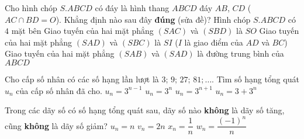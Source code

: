 \begin{ex}%
	Cho hình chóp $S.ABCD$ có đáy là hình thang $ABCD$ đáy $AB$, $CD$ ($AC \cap BD = O$). Khẳng định nào sau đây \textbf{đúng} (sửa đề)?
	\choice
	{Hình chóp $S.ABCD$ có $4$ mặt bên}
	{Giao tuyến của hai mặt phẳng $(SAC)$ và $(SBD)$ là $SO$}
	{Giao tuyến của hai mặt phẳng $(SAD)$ và $(SBC)$ là $SI$ ($I$ là giao điểm của $AD$ và $BC$)}
	{\True Giao tuyến của hai mặt phẳng $(SAB)$ và $(SAD)$ là đường trung bình của $ABCD$}
\end{ex}

\begin{ex}%
	Cho cấp số nhân có các số hạng lần lượt là $ 3;\, 9;\, 27;\, 81;\ldots$. Tìm số hạng tổng quát $u_n$ của cấp số nhân đã cho.
	\choice
	{$u_n=3^{n-1}$}
	{\True $u_n=3^n$}
	{$u_n=3^{n+1}$}
	{$u_n=3+3^n$}
\end{ex}

\begin{ex}%
	Trong các dãy số có số hạng tổng quát sau, dãy số nào {\bf không} là dãy số tăng, cũng {\bf không} là dãy số giảm?
	\choice
	{$u_n=n$}
	{$v_n=2n$}
	{$x_n=\dfrac{1}{n}$}
	{\True $w_n=\dfrac{\left(-1\right)^n}{n}$}
\end{ex}

